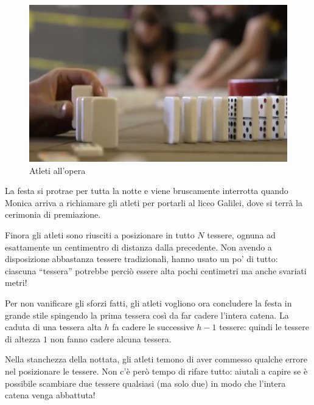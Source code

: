 \begin{figure}
  \vspace{-30pt}
  \begin{center}
    \includegraphics[width=0.9\linewidth]{domino.png}
    \caption{Atleti all'opera}
  \end{center}
\end{figure}

La festa si protrae per tutta la notte e viene bruscamente interrotta quando Monica
arriva a richiamare gli atleti per portarli al liceo Galilei, dove si terrà la
cerimonia di premiazione.

Finora gli atleti sono riusciti a posizionare in tutto $N$ tessere, ognuna ad
esattamente un centimentro di distanza dalla precedente. Non avendo a
disposizione abbastanza tessere tradizionali, hanno usato un po' di tutto:
ciascuna ``tessera'' potrebbe perciò essere alta pochi centimetri ma anche
svariati metri!

Per non vanificare gli sforzi fatti, gli atleti vogliono ora concludere la festa
in grande stile spingendo la prima tessera così da far cadere l'intera catena.
La caduta di una tessera alta $h$ fa cadere le successive $h-1$ tessere: quindi
le tessere di altezza $1$ non fanno cadere alcuna tessera.

Nella stanchezza della nottata, gli atleti temono di aver commesso qualche
errore nel posizionare le tessere. Non c'è però tempo di rifare tutto: aiutali a
capire se è possibile scambiare due tessere qualsiasi (ma solo due) in modo che
l'intera catena venga abbattuta!

